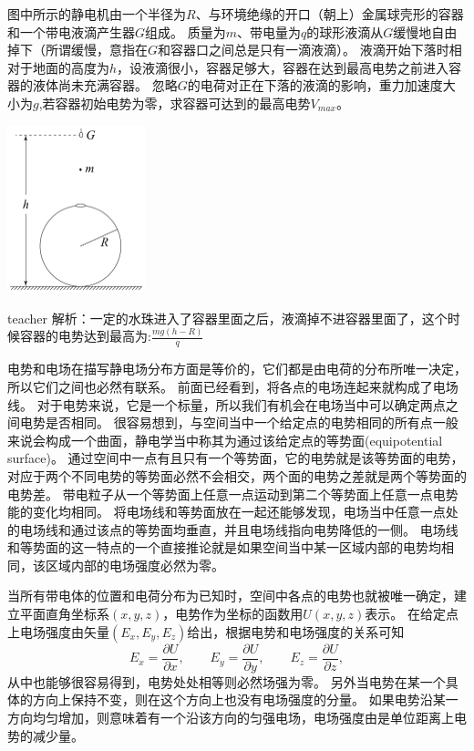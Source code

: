 \begin{example}
图中所示的静电机由一个半径为$R$、与环境绝缘的开口（朝上）金属球壳形的容器和一个带电液滴产生器$G$组成。
质量为$m$、带电量为$q$的球形液滴从$G$缓慢地自由掉下（所谓缓慢，意指在$G$和容器口之间总是只有一滴液滴）。
液滴开始下落时相对于地面的高度为$h$，设液滴很小，容器足够大，容器在达到最高电势之前进入容器的液体尚未充满容器。
忽略$G$的电荷对正在下落的液滴的影响，重力加速度大小为$g$,若容器初始电势为零，求容器可达到的最高电势$V_{max}$。
\begin{flushright}
\includegraphics[width = 0.3\textwidth]{images/elec-problem-24.pdf} 
\end{flushright}

\begin{taggedblock}{teacher}
\noindent
解析：一定的水珠进入了容器里面之后，液滴掉不进容器里面了，这个时候容器的电势达到最高为:$\frac{mg(h-R)}{q}$
\end{taggedblock}
\end{example}

电势和电场在描写静电场分布方面是等价的，它们都是由电荷的分布所唯一决定，所以它们之间也必然有联系。
前面已经看到，将各点的电场连起来就构成了电场线。
对于电势来说，它是一个标量，所以我们有机会在电场当中可以确定两点之间电势是否相同。
很容易想到，与空间当中一个给定点的电势相同的所有点一般来说会构成一个曲面，静电学当中称其为通过该给定点的{\heiti 等势面}(equipotential surface)。
通过空间中一点有且只有一个等势面，它的电势就是该等势面的电势，对应于两个不同电势的等势面必然不会相交，两个面的电势之差就是两个等势面的电势差。
带电粒子从一个等势面上任意一点运动到第二个等势面上任意一点电势能的变化均相同。
将电场线和等势面放在一起还能够发现，电场当中任意一点处的电场线和通过该点的等势面均垂直，并且电场线指向电势降低的一侧。
电场线和等势面的这一特点的一个直接推论就是如果空间当中某一区域内部的电势均相同，该区域内部的电场强度必然为零。

当所有带电体的位置和电荷分布为已知时，空间中各点的电势也就被唯一确定，建立平面直角坐标系$(x,y,z)$，电势作为坐标的函数用$U(x,y,z)$表示。
在给定点上电场强度由矢量$(E_x,E_y,E_z)$给出，根据电势和电场强度的关系可知
\begin{equation}
E_x = \frac{\partial U}{\partial x},\qquad E_y = \frac{\partial U}{\partial y},\qquad E_z = \frac{\partial U}{\partial z},
\end{equation}
从中也能够很容易得到，电势处处相等则必然场强为零。
另外当电势在某一个具体的方向上保持不变，则在这个方向上也没有电场强度的分量。
如果电势沿某一方向均匀增加，则意味着有一个沿该方向的匀强电场，电场强度由是单位距离上电势的减少量。

